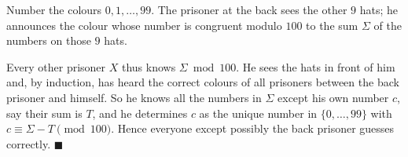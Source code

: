 Number the colours $0,1,\ldots,99$. The prisoner at the back sees the other $9$ hats; he announces the colour whose number is congruent modulo $100$ to the sum $\Sigma$ of the numbers on those $9$ hats.

Every other prisoner $X$ thus knows $\Sigma\bmod100$. He sees the hats in front of him and, by induction, has heard the correct colours of all prisoners between the back prisoner and himself. So he knows all the numbers in $\Sigma$ except his own number $c$, say their sum is $T$, and he determines $c$ as the unique number in $\{0,\ldots,99\}$ with $c\equiv\Sigma-T\pmod{100}$. Hence everyone except possibly the back prisoner guesses correctly. $\blacksquare$
